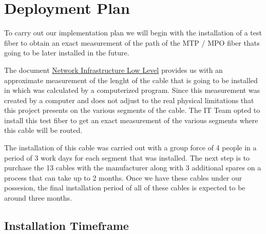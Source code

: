\newpage

\section{Deployment Plan}

To carry out our implementation plan we will begin with the installation of a test fiber to obtain an exact measurement of the path of the MTP / MPO fiber thats going to be later installed in the future.

\vspace{5 mm}

The document \href{https://confluence.lsstcorp.org/display/IT/Network+Infrastructure+Low-Level+Design+LLD?preview=/139036736/140285500/Telescope-Camera%20Optical%20Fibers%20layout%20v3.pdf}{Network Infrastructure Low Level} provides us with an approximate measurement of the lenght of the cable that is going to be installed in which was calculated by a computerized program. Since this measurement was created by a computer and does not adjust to the real physical limitations that this project presents on the various segments of the cable. The IT Team opted to install this test fiber to get an exact measurement of the various segments where this cable will be routed.  

The installation of this cable was carried out with a group force of 4 people in a period of 3 work days for each segment that was installed. The next step is to purchase the 13 cables with the manufacturer along with 3 additional spares on a process that can take up to 2 months. Once we have these cables under our possesion, the final installation period of all of these cables is expected to be around three months. 

\subsection{Installation Timeframe}

